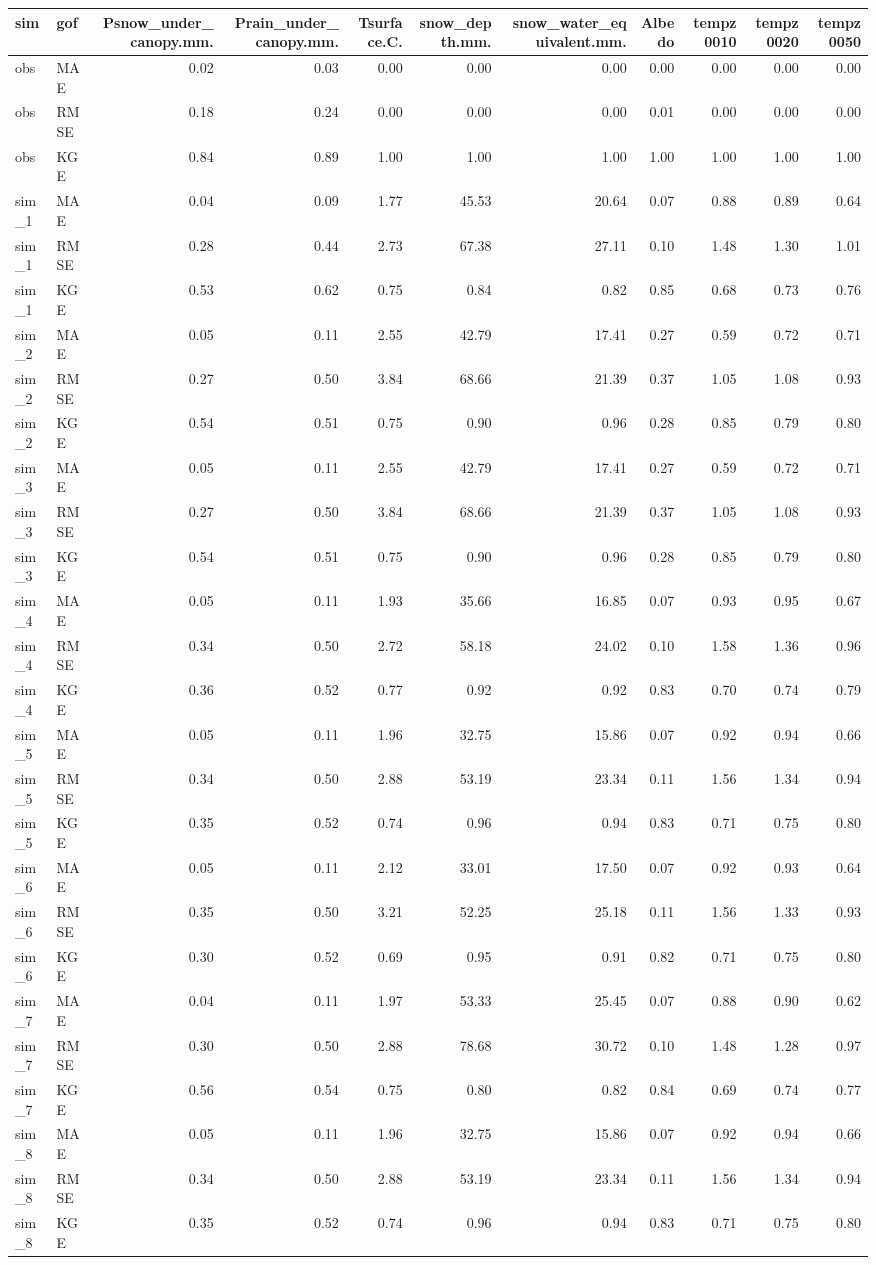 \documentclass[
]{article}
\begin{document}
\begin{longtable}[]{@{}llrrrrrrrrr@{}}
\toprule
sim & gof & Psnow\_under\_canopy.mm. & Prain\_under\_canopy.mm. &
Tsurface.C. & snow\_depth.mm. & snow\_water\_equivalent.mm. & Albedo &
tempz0010 & tempz0020 & tempz0050\tabularnewline
\midrule
\endhead
obs & MAE & 0.02 & 0.03 & 0.00 & 0.00 & 0.00 & 0.00 & 0.00 & 0.00 &
0.00\tabularnewline
obs & RMSE & 0.18 & 0.24 & 0.00 & 0.00 & 0.00 & 0.01 & 0.00 & 0.00 &
0.00\tabularnewline
obs & KGE & 0.84 & 0.89 & 1.00 & 1.00 & 1.00 & 1.00 & 1.00 & 1.00 &
1.00\tabularnewline
sim\_1 & MAE & 0.04 & 0.09 & 1.77 & 45.53 & 20.64 & 0.07 & 0.88 & 0.89 &
0.64\tabularnewline
sim\_1 & RMSE & 0.28 & 0.44 & 2.73 & 67.38 & 27.11 & 0.10 & 1.48 & 1.30
& 1.01\tabularnewline
sim\_1 & KGE & 0.53 & 0.62 & 0.75 & 0.84 & 0.82 & 0.85 & 0.68 & 0.73 &
0.76\tabularnewline
sim\_2 & MAE & 0.05 & 0.11 & 2.55 & 42.79 & 17.41 & 0.27 & 0.59 & 0.72 &
0.71\tabularnewline
sim\_2 & RMSE & 0.27 & 0.50 & 3.84 & 68.66 & 21.39 & 0.37 & 1.05 & 1.08
& 0.93\tabularnewline
sim\_2 & KGE & 0.54 & 0.51 & 0.75 & 0.90 & 0.96 & 0.28 & 0.85 & 0.79 &
0.80\tabularnewline
sim\_3 & MAE & 0.05 & 0.11 & 2.55 & 42.79 & 17.41 & 0.27 & 0.59 & 0.72 &
0.71\tabularnewline
sim\_3 & RMSE & 0.27 & 0.50 & 3.84 & 68.66 & 21.39 & 0.37 & 1.05 & 1.08
& 0.93\tabularnewline
sim\_3 & KGE & 0.54 & 0.51 & 0.75 & 0.90 & 0.96 & 0.28 & 0.85 & 0.79 &
0.80\tabularnewline
sim\_4 & MAE & 0.05 & 0.11 & 1.93 & 35.66 & 16.85 & 0.07 & 0.93 & 0.95 &
0.67\tabularnewline
sim\_4 & RMSE & 0.34 & 0.50 & 2.72 & 58.18 & 24.02 & 0.10 & 1.58 & 1.36
& 0.96\tabularnewline
sim\_4 & KGE & 0.36 & 0.52 & 0.77 & 0.92 & 0.92 & 0.83 & 0.70 & 0.74 &
0.79\tabularnewline
sim\_5 & MAE & 0.05 & 0.11 & 1.96 & 32.75 & 15.86 & 0.07 & 0.92 & 0.94 &
0.66\tabularnewline
sim\_5 & RMSE & 0.34 & 0.50 & 2.88 & 53.19 & 23.34 & 0.11 & 1.56 & 1.34
& 0.94\tabularnewline
sim\_5 & KGE & 0.35 & 0.52 & 0.74 & 0.96 & 0.94 & 0.83 & 0.71 & 0.75 &
0.80\tabularnewline
sim\_6 & MAE & 0.05 & 0.11 & 2.12 & 33.01 & 17.50 & 0.07 & 0.92 & 0.93 &
0.64\tabularnewline
sim\_6 & RMSE & 0.35 & 0.50 & 3.21 & 52.25 & 25.18 & 0.11 & 1.56 & 1.33
& 0.93\tabularnewline
sim\_6 & KGE & 0.30 & 0.52 & 0.69 & 0.95 & 0.91 & 0.82 & 0.71 & 0.75 &
0.80\tabularnewline
sim\_7 & MAE & 0.04 & 0.11 & 1.97 & 53.33 & 25.45 & 0.07 & 0.88 & 0.90 &
0.62\tabularnewline
sim\_7 & RMSE & 0.30 & 0.50 & 2.88 & 78.68 & 30.72 & 0.10 & 1.48 & 1.28
& 0.97\tabularnewline
sim\_7 & KGE & 0.56 & 0.54 & 0.75 & 0.80 & 0.82 & 0.84 & 0.69 & 0.74 &
0.77\tabularnewline
sim\_8 & MAE & 0.05 & 0.11 & 1.96 & 32.75 & 15.86 & 0.07 & 0.92 & 0.94 &
0.66\tabularnewline
sim\_8 & RMSE & 0.34 & 0.50 & 2.88 & 53.19 & 23.34 & 0.11 & 1.56 & 1.34
& 0.94\tabularnewline
sim\_8 & KGE & 0.35 & 0.52 & 0.74 & 0.96 & 0.94 & 0.83 & 0.71 & 0.75 &
0.80\tabularnewline
\bottomrule
\end{longtable}
\end{document}
